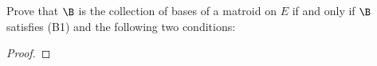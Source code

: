 \prob
{
    Prove that $\B$ is the collection of bases of a matroid on 
    $E$ if and only if $\B$ satisfies (B1) and the following two conditions:
}

\begin{proof}
    
\end{proof}